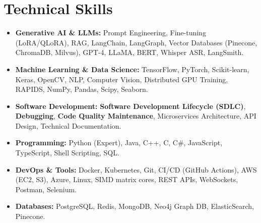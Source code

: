 \documentclass[10pt, a4paper]{article}
\begin{document}
\section{Technical Skills}
\begin{itemize}[leftmargin=0.15in, label={}]
    \item \textbf{Generative AI \& LLMs:} Prompt Engineering, Fine-tuning (LoRA/QLoRA), RAG, LangChain, LangGraph, Vector Databases (Pinecone, ChromaDB, Milvus), GPT-4, LLaMA, BERT, Whisper ASR, LangSmith.
    \item \textbf{Machine Learning \& Data Science:} TensorFlow, PyTorch, Scikit-learn, Keras, OpenCV, NLP, Computer Vision, Distributed GPU Training, RAPIDS, NumPy, Pandas, Scipy, Seaborn.
    \item \textbf{Software Development:} \textbf{Software Development Lifecycle (SDLC)}, \textbf{Debugging}, \textbf{Code Quality Maintenance}, Microservices Architecture, API Design, Technical Documentation.
    \item \textbf{Programming:} Python (Expert), Java, C++, C, C\#, JavaScript, TypeScript, Shell Scripting, SQL.
    \item \textbf{DevOps \& Tools:} Docker, Kubernetes, Git, CI/CD (GitHub Actions), AWS (EC2, S3), Azure, Linux, SIMD matrix cores, REST APIs, WebSockets, Postman, Selenium.
    \item \textbf{Databases:} PostgreSQL, Redis, MongoDB, Neo4j Graph DB, ElasticSearch, Pinecone.
\end{itemize}

\end{document}
